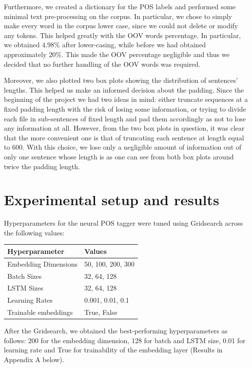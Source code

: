 \documentclass[11pt]{article}
\begin{document}
Furthermore, we created a dictionary for the POS labels and performed some minimal text pre-processing on the corpus. In particular, we chose to simply make every word in the corpus lower case, since we could not delete or modify any tokens. This helped greatly with the OOV words percentage. In particular, we obtained $4.98\%$ after lower-casing, while before we had obtained approximately $20\%$. This made the OOV percentage negligible and thus we decided that no further handling of the OOV words was required.

Moreover, we also plotted two box plots showing the distribution of sentences' lengths. This helped us make an informed decision about the padding. Since the beginning of the project we had two ideas in mind: either truncate sequences at a fixed padding length with the risk of losing some information, or trying to divide each file in sub-sentences of fixed length and pad them accordingly as not to lose any information at all. However, from the two box plots in question, it was clear that the more convenient one is that of truncating each sentence at length equal to 600. With this choice, we lose only a negligible amount of information out of only one sentence whose length is as one can see from both box plots around twice the padding length.

\section{Experimental setup and results}

Hyperparameters for the neural POS tagger were tuned using Gridsearch across the following values:



\begin{table}[ht]
\centering
\begin{tabular}{ll}
\toprule
\textbf{Hyperparameter} & \textbf{Values} \\
\midrule
Embedding Dimensions & 50, 100, 200, 300 \\
Batch Sizes & 32, 64, 128 \\
LSTM Sizes & 32, 64, 128 \\
Learning Rates & 0.001, 0.01, 0.1 \\
Trainable embeddings & True, False \\
\bottomrule
\end{tabular}
\end{table}

After the Gridsearch, we obtained the best-performing hyperparameters as follows: 200 for the embedding dimension, 128 for batch and LSTM size, 0.01 for learning rate and True for trainability of the embedding layer (Results in Appendix A below).
\end{document}

